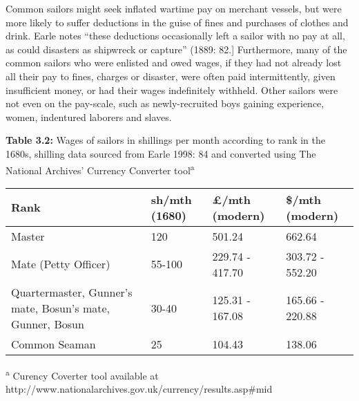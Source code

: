 \begin{styleStandard}
Common sailors might seek inflated wartime pay on merchant vessels, but were more likely to suffer deductions in the guise of fines and purchases of clothes and drink. Earle notes “these deductions occasionally left a sailor with no pay at all, as could disasters as shipwreck or capture” (1889: 82.] Furthermore, many of the common sailors who were enlisted and owed wages, if they had not already lost all their pay to fines, charges or disaster, were often paid intermittently, given insufficient money, or had their wages indefinitely withheld. Other sailors were not even on the pay-scale, such as newly-recruited boys gaining experience, women, indentured laborers and slaves. 
\end{styleStandard}


\begin{styleStandard}
\textbf{Table 3.2: }Wages of sailors in shillings per month according to rank in the 1680s, shilling data sourced from Earle 1998: 84 and converted using The National Archives’ Currency Converter tool\textsuperscript{a}
\end{styleStandard}


\begin{flushleft}
\tablehead{}
\begin{supertabular}{m{2.05666in}m{1.0670599in}m{1.3170599in}m{1.2018598in}}
\hline
\textbf{Rank} &
\textbf{sh/mth (1680)} &
\textbf{£/mth (modern)} &
\textbf{\$/mth (modern)}\\\hline
Master &
120 &
501.24 &
662.64\\\hline
Mate (Petty Officer) &
55-100 &
229.74 - 417.70 &
303.72 - 552.20\\\hline
Quartermaster, Gunner’s mate, Bosun’s mate, Gunner, Bosun &
30-40 &
125.31 - 167.08 &
165.66 - 220.88\\\hline
Common Seaman &
25 &
104.43 &
138.06\\\hline
\end{supertabular}
\end{flushleft}
\begin{styleStandard}
\textsuperscript{a} Curency Coverter tool available at http://www.nationalarchives.gov.uk/currency/results.asp\#mid
\end{styleStandard}


